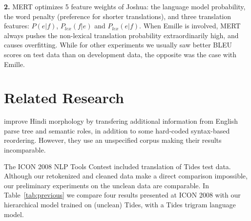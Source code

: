 \documentclass[11pt]{article}
\def\perscite#1{\citet{#1}}
\def\Tref#1{Table~\ref{#1}}
\begin{document}
{\bf 2.}
MERT optimizes 5 feature weights of Joshua: the language model
        probability, the word penalty (preference for shorter translations),
        and three translation features: $P(e|f)$, $P_{lex}(f|e)$ and
        $P_{lex}(e|f)$. When Emille is involved, MERT always pushes the
        non-lexical translation probability extraordinarily high, and causes
        overfitting. While for other experiments we usually saw better BLEU
        scores on test data than on development data, the opposite was the case
        with Emille.

\section{Related Research}



\perscite{pushpak:2009} improve Hindi morphology by transfering additional
information from English parse tree and semantic roles, in addition to some
hard-coded syntax-based reordering. However, they use an unspecified corpus
making their results incomparable.


\label{previous}

The ICON 2008 NLP Tools Contest \citep{nlptoolscontest:2008:summary}
included translation of Tides test data. Although our retokenized and cleaned
data make a direct comparison impossible, our preliminary experiments on the
unclean data are comparable. In \Tref{tab:previous} we compare four results
presented at ICON 2008 with our hierarchical model trained on (unclean) Tides,
with a Tides trigram language model.
\end{document}
